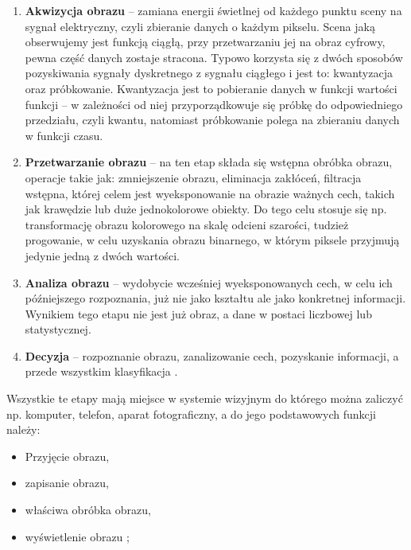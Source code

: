 \documentclass[eng,oneside]{mgr}
\begin{document}
\begin{enumerate}
\item 	\textbf{Akwizycja obrazu} – zamiana energii świetlnej od każdego punktu sceny na sygnał elektryczny, czyli zbieranie danych o każdym pikselu. Scena jaką obserwujemy jest funkcją ciągłą, przy przetwarzaniu jej na obraz cyfrowy, pewna część danych zostaje stracona. Typowo korzysta się z dwóch sposobów pozyskiwania sygnały dyskretnego z sygnału ciągłego i jest to: kwantyzacja oraz próbkowanie. Kwantyzacja jest to pobieranie danych w funkcji wartości funkcji – w zależności od niej przyporządkowuje się próbkę do odpowiedniego przedziału, czyli kwantu, natomiast próbkowanie polega na zbieraniu danych w funkcji czasu.
\item 	\textbf{Przetwarzanie obrazu} – na ten etap składa się wstępna obróbka obrazu, operacje takie jak: zmniejszenie obrazu, eliminacja zakłóceń, filtracja wstępna, której celem jest wyeksponowanie na obrazie ważnych cech, takich jak krawędzie lub duże jednokolorowe obiekty. Do tego celu stosuje się np. transformację obrazu kolorowego na skalę odcieni szarości, tudzież progowanie, w celu uzyskania obrazu binarnego, w którym piksele przyjmują jedynie jedną z dwóch wartości.
\item 	\textbf{Analiza obrazu} – wydobycie wcześniej wyeksponowanych cech, w celu ich późniejszego rozpoznania, już nie jako kształtu ale jako konkretnej informacji. Wynikiem tego etapu nie jest już obraz, a dane w postaci liczbowej lub statystycznej.
\item 	\textbf{Decyzja} – rozpoznanie obrazu, zanalizowanie cech, pozyskanie informacji, a przede wszystkim klasyfikacja \cite{obrazy}.
\end{enumerate}
\par Wszystkie te etapy mają miejsce w systemie wizyjnym do którego można zaliczyć np. komputer, telefon, aparat fotograficzny, a do jego podstawowych funkcji należy:
\begin{itemize}
\item Przyjęcie obrazu,
\item zapisanie obrazu,
\item właściwa obróbka obrazu,
\item wyświetlenie obrazu \cite{wizja};
\end{itemize}
\end{document}
